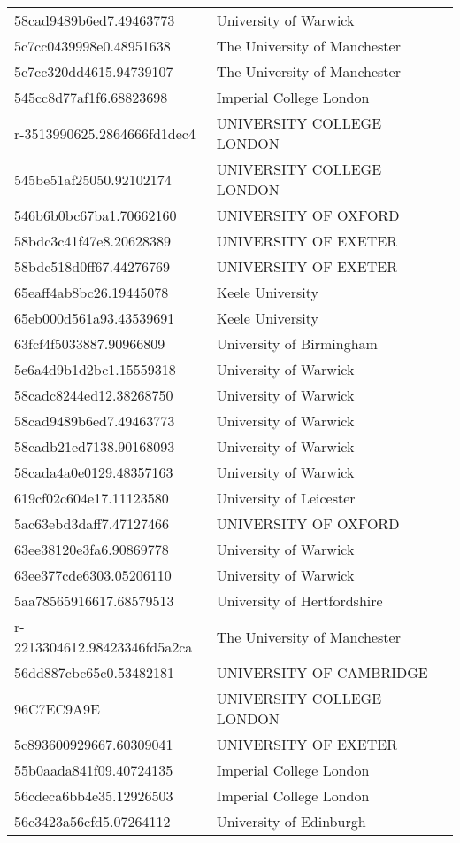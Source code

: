 \begin{tabular}{ll}
58cad9489b6ed7.49463773 & University of Warwick \\
5c7cc0439998e0.48951638 & The University of Manchester \\
5c7cc320dd4615.94739107 & The University of Manchester \\
545cc8d77af1f6.68823698 & Imperial College London \\
r-3513990625.2864666fd1dec4 & UNIVERSITY COLLEGE LONDON \\
545be51af25050.92102174 & UNIVERSITY COLLEGE LONDON \\
546b6b0bc67ba1.70662160 & UNIVERSITY OF OXFORD \\
58bdc3c41f47e8.20628389 & UNIVERSITY OF EXETER \\
58bdc518d0ff67.44276769 & UNIVERSITY OF EXETER \\
65eaff4ab8bc26.19445078 & Keele University \\
65eb000d561a93.43539691 & Keele University \\
63fcf4f5033887.90966809 & University of Birmingham \\
5e6a4d9b1d2bc1.15559318 & University of Warwick \\
58cadc8244ed12.38268750 & University of Warwick \\
58cad9489b6ed7.49463773 & University of Warwick \\
58cadb21ed7138.90168093 & University of Warwick \\
58cada4a0e0129.48357163 & University of Warwick \\
619cf02c604e17.11123580 & University of Leicester \\
5ac63ebd3daff7.47127466 & UNIVERSITY OF OXFORD \\
63ee38120e3fa6.90869778 & University of Warwick \\
63ee377cde6303.05206110 & University of Warwick \\
5aa78565916617.68579513 & University of Hertfordshire \\
r-2213304612.98423346fd5a2ca & The University of Manchester \\
56dd887cbc65c0.53482181 & UNIVERSITY OF CAMBRIDGE \\
96C7EC9A9E & UNIVERSITY COLLEGE LONDON \\
5c893600929667.60309041 & UNIVERSITY OF EXETER \\
55b0aada841f09.40724135 & Imperial College London \\
56cdeca6bb4e35.12926503 & Imperial College London \\
56c3423a56cfd5.07264112 & University of Edinburgh \\

\end{tabular}
